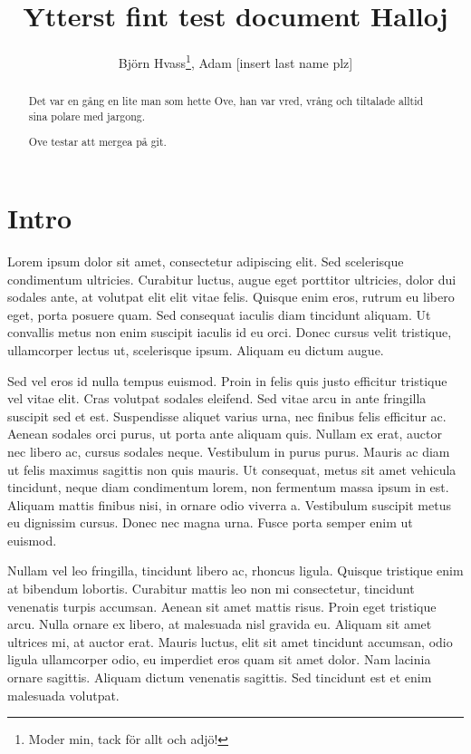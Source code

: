 \documentclass[a4paper,10pt]{article}
\title{Ytterst fint test document Halloj}
\author{Björn Hvass\thanks{Moder min, tack för allt och adjö!}, Adam [insert last name plz]}
\begin{document}
\maketitle

\begin{abstract}
Det var en gång en lite man som hette Ove, han var vred, vrång och tiltalade alltid sina polare med jargong.


Ove testar att mergea på git.


\end{abstract}

\section{Intro}\label{sec:Intro}
Lorem ipsum dolor sit amet, consectetur adipiscing elit. Sed scelerisque condimentum ultricies. Curabitur luctus, augue eget porttitor ultricies, dolor dui sodales ante, at volutpat elit elit vitae felis. Quisque enim eros, rutrum eu libero eget, porta posuere quam. Sed consequat iaculis diam tincidunt aliquam. Ut convallis metus non enim suscipit iaculis id eu orci. Donec cursus velit tristique, ullamcorper lectus ut, scelerisque ipsum. Aliquam eu dictum augue.

Sed vel eros id nulla tempus euismod. Proin in felis quis justo efficitur tristique vel vitae elit. Cras volutpat sodales eleifend. Sed vitae arcu in ante fringilla suscipit sed et est. Suspendisse aliquet varius urna, nec finibus felis efficitur ac. Aenean sodales orci purus, ut porta ante aliquam quis. Nullam ex erat, auctor nec libero ac, cursus sodales neque. Vestibulum in purus purus. Mauris ac diam ut felis maximus sagittis non quis mauris. Ut consequat, metus sit amet vehicula tincidunt, neque diam condimentum lorem, non fermentum massa ipsum in est. Aliquam mattis finibus nisi, in ornare odio viverra a. Vestibulum suscipit metus eu dignissim cursus. Donec nec magna urna. Fusce porta semper enim ut euismod.

Nullam vel leo fringilla, tincidunt libero ac, rhoncus ligula. Quisque tristique enim at bibendum lobortis. Curabitur mattis leo non mi consectetur, tincidunt venenatis turpis accumsan. Aenean sit amet mattis risus. Proin eget tristique arcu. Nulla ornare ex libero, at malesuada nisl gravida eu. Aliquam sit amet ultrices mi, at auctor erat. Mauris luctus, elit sit amet tincidunt accumsan, odio ligula ullamcorper odio, eu imperdiet eros quam sit amet dolor. Nam lacinia ornare sagittis. Aliquam dictum venenatis sagittis. Sed tincidunt est et enim malesuada volutpat.
\end{document}

